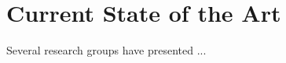 \chapter{Current State of the Art}
\label{ch:SOTA}

Several research groups \cite{frankl:1959}\cite{postman:2005} have presented ...